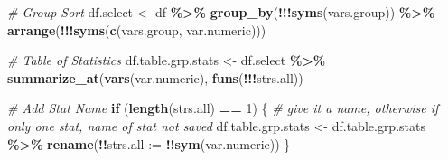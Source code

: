 \documentclass[
]{book}
\newenvironment{Shaded}{\begin{snugshade}}{\end{snugshade}}
\newcommand{\CommentTok}[1]{\textcolor[rgb]{0.56,0.35,0.01}{\textit{#1}}}
\newcommand{\ControlFlowTok}[1]{\textcolor[rgb]{0.13,0.29,0.53}{\textbf{#1}}}
\newcommand{\DataTypeTok}[1]{\textcolor[rgb]{0.13,0.29,0.53}{#1}}
\newcommand{\DecValTok}[1]{\textcolor[rgb]{0.00,0.00,0.81}{#1}}
\newcommand{\KeywordTok}[1]{\textcolor[rgb]{0.13,0.29,0.53}{\textbf{#1}}}
\newcommand{\NormalTok}[1]{#1}
\newcommand{\OperatorTok}[1]{\textcolor[rgb]{0.81,0.36,0.00}{\textbf{#1}}}
\newcommand{\StringTok}[1]{\textcolor[rgb]{0.31,0.60,0.02}{#1}}
\begin{document}
\begin{Shaded}
\begin{Highlighting}[]
  \CommentTok{\# Group Sort}
\NormalTok{  df.select \textless{}{-}}\StringTok{ }\NormalTok{df }\OperatorTok{\%\textgreater{}\%}
\StringTok{    }\KeywordTok{group\_by}\NormalTok{(}\OperatorTok{!!!}\KeywordTok{syms}\NormalTok{(vars.group)) }\OperatorTok{\%\textgreater{}\%}
\StringTok{    }\KeywordTok{arrange}\NormalTok{(}\OperatorTok{!!!}\KeywordTok{syms}\NormalTok{(}\KeywordTok{c}\NormalTok{(vars.group, var.numeric)))}
  
  \CommentTok{\# Table of Statistics}
\NormalTok{  df.table.grp.stats \textless{}{-}}\StringTok{ }\NormalTok{df.select }\OperatorTok{\%\textgreater{}\%}\StringTok{ }
\StringTok{    }\KeywordTok{summarize\_at}\NormalTok{(}\KeywordTok{vars}\NormalTok{(var.numeric), }\KeywordTok{funs}\NormalTok{(}\OperatorTok{!!!}\NormalTok{strs.all))}
  
  \CommentTok{\# Add Stat Name}
  \ControlFlowTok{if}\NormalTok{ (}\KeywordTok{length}\NormalTok{(strs.all) }\OperatorTok{==}\StringTok{ }\DecValTok{1}\NormalTok{) \{}
    \CommentTok{\# give it a name, otherwise if only one stat, name of stat not saved}
\NormalTok{    df.table.grp.stats \textless{}{-}}\StringTok{ }\NormalTok{df.table.grp.stats }\OperatorTok{\%\textgreater{}\%}\StringTok{ }
\StringTok{      }\KeywordTok{rename}\NormalTok{(}\OperatorTok{!!}\DataTypeTok{strs.all :=} \OperatorTok{!!}\KeywordTok{sym}\NormalTok{(var.numeric))}
\NormalTok{  \}}
  

\end{Highlighting}
\end{Shaded}
\end{document}
